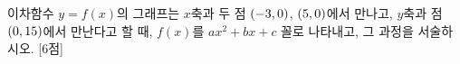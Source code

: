 이차함수 $y=f(x)$의 그래프는 $x$축과 두 점 $(-3{,}\mkern3mu 0)$, $(5{,}\mkern3mu 0)$에서 만나고, $y$축과 점 $(0{,}\mkern3mu 15)$에서 만난다고 할 때, $f(x)$를 $ax^2+bx+c$ 꼴로 나타내고, 그 과정을 서술하시오.  \mbox{[6점]}
